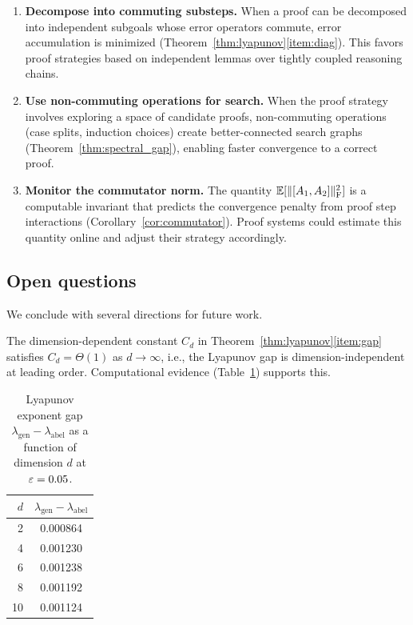\begin{enumerate}[leftmargin=*,itemsep=2pt]
\item \textbf{Decompose into commuting substeps.}
  When a proof can be decomposed into independent subgoals whose error
  operators commute, error accumulation is minimized
  (Theorem~\ref{thm:lyapunov}\ref{item:diag}).  This favors proof
  strategies based on independent lemmas over tightly coupled reasoning
  chains.

\item \textbf{Use non-commuting operations for search.}
  When the proof strategy involves exploring a space of candidate proofs,
  non-commuting operations (case splits, induction choices) create
  better-connected search graphs (Theorem~\ref{thm:spectral_gap}),
  enabling faster convergence to a correct proof.

\item \textbf{Monitor the commutator norm.}
  The quantity $\mathbb{E}[\lVert [A_1, A_2] \rVert_{\mathrm{F}}^2]$ is a computable
  invariant that predicts the convergence penalty from proof step
  interactions (Corollary~\ref{cor:commutator}).  Proof systems could
  estimate this quantity online and adjust their strategy accordingly.
\end{enumerate}

\subsection{Open questions}

We conclude with several directions for future work.

\begin{conjecture}\label{conj:constant}
The dimension-dependent constant $C_d$ in
Theorem~\ref{thm:lyapunov}\ref{item:gap} satisfies
$C_d = \Theta(1)$ as $d \to \infty$, i.e., the Lyapunov gap is
dimension-independent at leading order.  Computational evidence
(Table~\ref{tab:dimension}) supports this.
\end{conjecture}

\begin{table}[ht]
\centering
\caption{Lyapunov exponent gap $\lambda_{\mathrm{gen}} - \lambda_{\mathrm{abel}}$
  as a function of dimension $d$ at $\varepsilon = 0.05$.}\label{tab:dimension}
\begin{tabular}{@{}rc@{}}
\toprule
$d$ & $\lambda_{\mathrm{gen}} - \lambda_{\mathrm{abel}}$ \\
\midrule
2  & 0.000864 \\
4  & 0.001230 \\
6  & 0.001238 \\
8  & 0.001192 \\
10 & 0.001124 \\
\bottomrule
\end{tabular}
\end{table}

